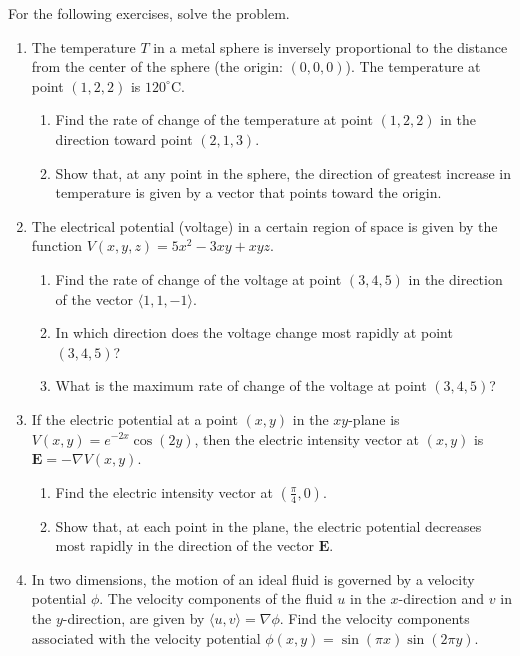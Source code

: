 \documentclass{exercises}
\begin{document}
For the following exercises, solve the problem.

\begin{enumerate}[resume]
\item The temperature $T$ in a metal sphere is inversely proportional to the distance from the center of the sphere (the origin: $(0,0,0)$). The temperature at point $(1,2,2)$ is $120^\circ \text{C}$.
\begin{enumerate}[label=(\alph*)]
  \item Find the rate of change of the temperature at point $(1,2,2)$ in the direction toward point $(2,1,3)$.
  \item Show that, at any point in the sphere, the direction of greatest increase in temperature is given by a vector that points toward the origin.
\end{enumerate}
\item The electrical potential (voltage) in a certain region of space is given by the function $V(x,y,z)=5x^{2}-3xy+xyz$.
\begin{enumerate}[label=(\alph*)]
  \item Find the rate of change of the voltage at point $(3,4,5)$ in the direction of the vector $\langle1,1,-1\rangle$.
  \item In which direction does the voltage change most rapidly at point $(3,4,5)$?
  \item What is the maximum rate of change of the voltage at point $(3,4,5)$?
\end{enumerate}
\item If the electric potential at a point $(x,y)$ in the $xy$-plane is $V(x,y)=e^{-2x}\cos(2y)$, then the electric intensity vector at $(x,y)$ is $\mathbf{E}=-\nabla V(x,y)$.
\begin{enumerate}[label=(\alph*)]
  \item Find the electric intensity vector at $(\frac{\pi}{4},0)$.
  \item Show that, at each point in the plane, the electric potential decreases most rapidly in the direction of the vector $\mathbf{E}$.
\end{enumerate}
\item In two dimensions, the motion of an ideal fluid is governed by a velocity potential $\phi$. The velocity components of the fluid $u$ in the $x$-direction and $v$ in the $y$-direction, are given by $\langle u,v\rangle=\nabla \phi$. Find the velocity components associated with the velocity potential $\phi(x,y)=\sin(\pi x)\sin(2\pi y)$.
\end{enumerate}
\end{document}
